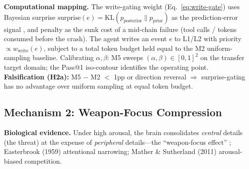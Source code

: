 \textbf{Computational mapping.} The write-gating weight (Eq.~\ref{eq:write-gate}) uses Bayesian surprise $\text{surprise}(e) = \text{KL}(p_{\text{posterior}} \| p_{\text{prior}})$ as the prediction-error signal \cite{ittibaldi2009}, and penalty as the sunk cost of a mid-chain failure (tool calls / tokens consumed before the crash). The agent writes an event $e$ to L1/L2 with priority $\propto w_{\text{write}}(e)$, subject to a total token budget held equal to the M2 uniform-sampling baseline. Calibrating $\alpha,\beta$: M5 sweeps $(\alpha,\beta) \in [0,1]^2$ on the transfer target domain; the Pass@1 iso-contour identifies the operating point. \textbf{Falsification (H2a):} M5 $-$ M2 $<$ 1pp or direction reversal $\Rightarrow$ surprise-gating has no advantage over uniform sampling at equal token budget.

\subsection{Mechanism 2: Weapon-Focus Compression}

\textbf{Biological evidence.} Under high arousal, the brain consolidates \emph{central} details (the threat) at the expense of \emph{peripheral} details---the ``weapon-focus effect'' \cite{loftus1987}; Easterbrook (1959) attentional narrowing; Mather \& Sutherland (2011) arousal-biased competition.

